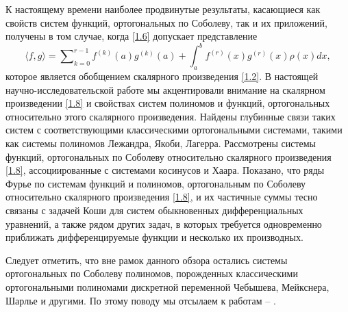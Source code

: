 К настоящему времени наиболее продвинутые результаты, касающиеся как  свойств систем  функций, ортогональных по Соболеву, так и их приложений,  получены в том случае, когда \eqref{1.6} допускает представление
\begin{equation}\label{1.8}
\langle f,g\rangle=\sum\nolimits_{k=0}^{r-1}f^{(k)}(a)g^{(k)}(a)+\int_{a}^{b}f^{(r)}(x)g^{(r)}(x)\rho(x)dx,
\end{equation}
которое является обобщением скалярного произведения \eqref{1.2}. В настоящей научно-исследовательской работе мы акцентировали внимание на скалярном произведении \eqref{1.8} и свойствах систем полиномов и функций, ортогональных относительно этого скалярного произведения. Найдены глубинные связи таких систем с соответствующими классическими ортогональными системами, такими как системы полиномов Лежандра, Якоби, Лагерра. Рассмотрены системы функций, ортогональных по Соболеву относительно скалярного произведения \eqref{1.8}, ассоциированные с системами косинусов и Хаара.  Показано, что  ряды Фурье по системам функций и полиномов, ортогональным по Соболеву относительно скалярного произведения \eqref{1.8}, и их частичные суммы тесно связаны с задачей Коши для систем обыкновенных дифференциальных уравнений, а также рядом других задач, в которых требуется одновременно приближать дифференцируемые функции и несколько их производных.

Следует отметить, что вне рамок данного обзора остались  системы ортогональных по Соболеву полиномов, порожденных классическими ортогональными полиномами дискретной переменной  Чебышева, Мейкснера,  Шарлье и другими. По этому поводу мы отсылаем к работам  \cite{Bav} -- \cite{SharGus}.



